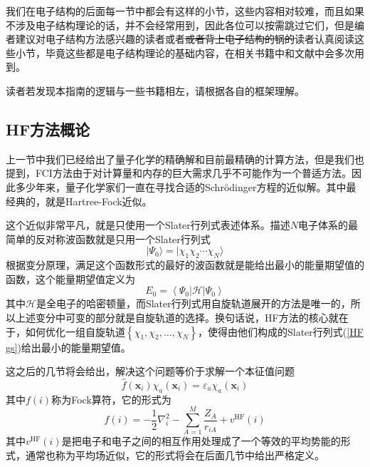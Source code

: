 \documentclass[12pt,a4paper,openany,twoside]{book}
\numberwithin{equation}{section}
\newcommand{\sch}{Schr\"odinger}
\begin{document}
        我们在电子结构的后面每一节中都会有这样的小节，这些内容相对较难，而且如果不涉及电子结构理论的话，并不会经常用到，因此各位可以按需跳过它们，但是编者建议对电子结构方法感兴趣的读者或者\sout{或者背上电子结构的锅的}读者认真阅读这些小节，毕竟这些都是电子结构理论的基础内容，在相关书籍中和文献中会多次用到。
        
        读者若发现本指南的逻辑与一些书籍相左，请根据各自的框架理解。
        \subsection{HF方法概论}
          上一节中我们已经给出了量子化学的精确解和目前最精确的计算方法，但是我们也提到，FCI方法由于对计算量和内存的巨大需求几乎不可能作为一个普适方法。因此多少年来，量子化学家们一直在寻找合适的\sch 方程的近似解。其中最经典的，就是Hartree-Fock近似。

          这个近似非常平凡，就是只使用一个Slater行列式表述体系。描述$N$电子体系的最简单的反对称波函数就是只用一个Slater行列式
          \begin{equation}
            | \Psi_{0} \rangle=| \chi_{1} \chi_{2} \cdots \chi_{N} \rangle
            \label{HF gs}
          \end{equation}
          根据变分原理，满足这个函数形式的最好的波函数就是能给出最小的能量期望值的函数，这个能量期望值定义为
          \begin{equation}
            E_{0}=\left\langle\Psi_{0}|\mathscr{H}| \Psi_{0}\right\rangle
            \label{HF energy}
          \end{equation}
          其中$\mathscr{H}$是全电子的哈密顿量，而Slater行列式用自旋轨道展开的方法是唯一的，所以上述变分中可变的部分就是自旋轨道的选择。换句话说，HF方法的核心就在于，如何优化一组自旋轨道$\left\{\chi_1,\chi_2,\dots,\chi_N\right\}$，使得由他们构成的Slater行列式(\ref{HF gs})给出最小的能量期望值。

          这之后的几节将会给出，解决这个问题等价于求解一个本征值问题
          \begin{equation}
            \hat{f}(\mathbf{x}_i)\chi_a(\mathbf{x}_i) = \varepsilon_a\chi_a(\mathbf{x}_i)
            \label{HF equation}
          \end{equation}
          其中$f(i)$称为Fock算符，它的形式为
          \begin{equation}
            f(i)=-\frac{1}{2} \nabla_{i}^{2}-\sum_{A=1}^{M} \frac{Z_{A}}{r_{i A}}+v^{\mathrm{HF}}(i)
          \end{equation}
          其中$v^{\mathrm{HF}}(i)$是把电子和电子之间的相互作用处理成了一个等效的平均势能的形式，通常也称为平均场近似，它的形式将会在后面几节中给出严格定义。
          
\end{document}
